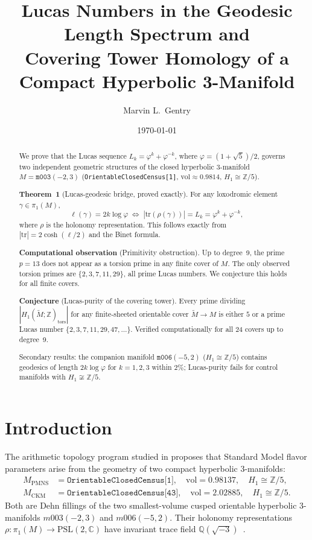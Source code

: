 \documentclass[12pt]{article}
\title{Lucas Numbers in the Geodesic Length Spectrum and\\
Covering Tower Homology of a Compact Hyperbolic 3-Manifold}
\author[1]{Marvin L.\ Gentry}
\affil[1]{Independent Researcher, Seattle, WA\\
\texttt{drmlgentry@protonmail.com} \quad ORCID: 0009-0006-4550-2663}
\date{\today}
\theoremstyle{definition}
\newcommand{\Q}{\mathbb{Q}}
\newcommand{\C}{\mathbb{C}}
\newcommand{\ph}{\varphi}
\begin{document}
\maketitle

\begin{abstract}
We prove that the Lucas sequence $L_k = \ph^k + \ph^{-k}$,
where $\ph = (1+\sqrt{5})/2$, governs two independent geometric
structures of the closed hyperbolic 3-manifold
$M = \texttt{m003}(-2,3)$ (\texttt{OrientableClosedCensus[1]},
$\mathrm{vol} \approx 0.9814$, $H_1 \cong \mathbb{Z}/5$).

\textbf{Theorem~1} (Lucas-geodesic bridge, proved exactly).
For any loxodromic element $\gamma \in \pi_1(M)$,
\[
  \ell(\gamma) = 2k\log\varphi \;\Longleftrightarrow\;
  |\mathrm{tr}(\rho(\gamma))| = L_k = \varphi^k + \varphi^{-k},
\]
where $\rho$ is the holonomy representation. This follows exactly
from $|\mathrm{tr}| = 2\cosh(\ell/2)$ and the Binet formula.

\textbf{Computational observation} (Primitivity obstruction).
Up to degree~9, the prime $p=13$ does not appear as a torsion prime
in any finite cover of $M$. The only observed torsion primes are
$\{2,3,7,11,29\}$, all prime Lucas numbers. We conjecture this holds
for all finite covers.

\textbf{Conjecture} (Lucas-purity of the covering tower).
Every prime dividing $|H_1(\tilde{M};\mathbb{Z})_{\mathrm{tors}}|$
for any finite-sheeted orientable cover $\tilde{M} \to M$ is either
$5$ or a prime Lucas number $\{2, 3, 7, 11, 29, 47, \ldots\}$.
Verified computationally for all 24 covers up to degree~9.

Secondary results: the companion manifold $\texttt{m006}(-5,2)$
($H_1 \cong \mathbb{Z}/5$) contains geodesics of length $2k\log\varphi$
for $k=1,2,3$ within $2\%$; Lucas-purity fails for control manifolds
with $H_1 \not\cong \mathbb{Z}/5$.
\end{abstract}

\section{Introduction}

The arithmetic topology program studied in
\cite{gentry-ckm,gentry-pmns,gentry-cp,gentry-twist}
proposes that Standard Model flavor parameters arise from the geometry
of two compact hyperbolic 3-manifolds:
\begin{align*}
M_{\mathrm{PMNS}} &= \texttt{OrientableClosedCensus[1]},\quad
  \mathrm{vol} = 0.98137,\quad H_1 \cong \mathbb{Z}/5,\\
M_{\mathrm{CKM}}  &= \texttt{OrientableClosedCensus[43]},\quad
  \mathrm{vol} = 2.02885,\quad H_1 \cong \mathbb{Z}/5.
\end{align*}
Both are Dehn fillings of the two smallest-volume cusped orientable
hyperbolic 3-manifolds $m003(-2,3)$ and $m006(-5,2)$. Their
holonomy representations $\rho\colon \pi_1(M) \to \mathrm{PSL}(2,\C)$
have invariant trace field $\Q(\sqrt{-3})$~\cite{maclachlan-reid}.
\end{document}
